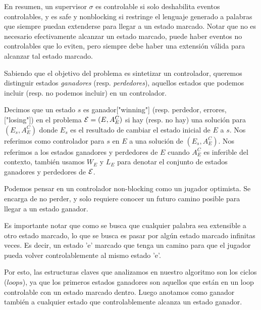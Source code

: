 En resumen, un supervisor $\sigma$ es controlable si solo deshabilita eventos controlables, y es safe y nonblocking si restringe el lenguaje generado a palabras que siempre puedan extenderse para llegar a un estado marcado. Notar que no es necesario efectivamente alcanzar un estado marcado, puede haber eventos no controlables que lo eviten, pero siempre debe haber una extensión válida para alcanzar tal estado marcado.

Sabiendo que el objetivo del problema es sintetizar un controlador, queremos distinguir estados \textit{ganadores} (resp. \textit{perdedores}), aquellos estados que podemos incluir (resp. no podemos incluir) en un controlador. 

\begin{notation}
	Decimos que un estado $s$ es ganador["winning"] (resp. perdedor, errores, ["losing"]) en el problema $\mathcal{E} = (E, A_E^C)$ 
	si hay (resp. no hay) una solución para $(E_s, A_E^C)$ donde $E_s$ es el resultado de cambiar el estado inicial de $E$ a $s$.
	Nos referimos como controlador para $s$ en $E$ a una solución de $(E_s, A_E^C)$.
	Nos referimos a los estados ganadores y perdedores de $E$ cuando $A_E^C$ es inferible del contexto, también usamos $W_E$ y $L_E$ para denotar el conjunto de estados ganadores y perdedores de $\mathcal{E}$.
\end{notation}

Podemos pensar en un controlador non-blocking como un jugador optimista. Se encarga de no perder, y solo requiere conocer un futuro camino posible para llegar a un estado ganador.


Es importante notar que como se busca que cualquier palabra sea extensible a otro estado marcado, lo que se busca es pasar por algún estado marcado infinitas veces. Es decir, un estado 'e' marcado que tenga un camino para que el jugador pueda volver controlablemente al mismo estado 'e'.

Por esto, las estructuras claves que analizamos en nuestro algoritmo son los ciclos ($loops$), ya que los primeros estados ganadores son aquellos que están en un loop controlable con un estado marcado dentro. Luego anotamos como ganador también a cualquier estado que controlablemente alcanza un estado ganador.

